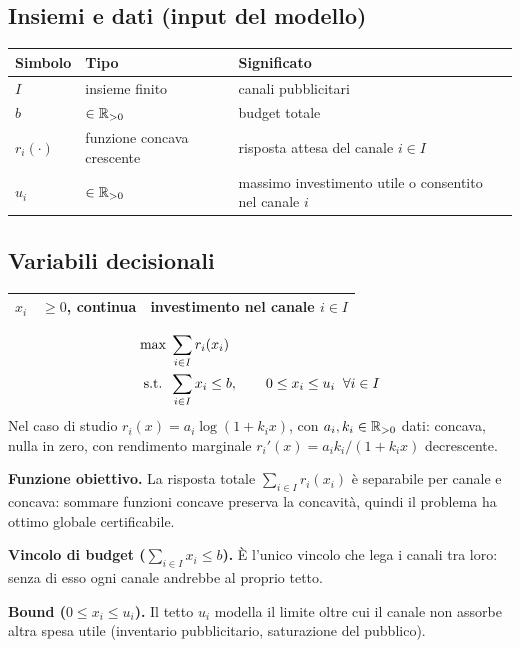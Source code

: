 \subsection*{Insiemi e dati (input del modello)}
\begin{center}\small
\begin{tabular}{llp{7.2cm}}
\toprule
Simbolo & Tipo & Significato \\
\midrule
$I$ & insieme finito & canali pubblicitari \\
$b$ & $\in \mathbb{R}_{> 0}$ & budget totale \\
$r_i(\cdot)$ & funzione concava crescente & risposta attesa del canale $i \in I$ \\
$u_i$ & $\in \mathbb{R}_{> 0}$ & massimo investimento utile o consentito nel canale $i$ \\
\bottomrule
\end{tabular}
\end{center}

\subsection*{Variabili decisionali}
\begin{center}\small
\begin{tabular}{llp{7.2cm}}
\toprule
$x_i$ & $\ge 0$, continua & investimento nel canale $i \in I$ \\
\bottomrule
\end{tabular}
\end{center}

\begin{modello}
\begin{align}
\max\;& \sum_{i \in I} r_i(x_i) \notag\\
\text{s.t.}\;\; & \sum_{i \in I} x_i \le b, \qquad 0 \le x_i \le u_i \;\;\forall i \in I \notag
\end{align}
Nel caso di studio $r_i(x) = a_i \log(1 + k_i x)$, con $a_i, k_i \in \mathbb{R}_{>0}$ dati:
concava, nulla in zero, con rendimento marginale
$r_i'(x) = a_i k_i / (1 + k_i x)$ decrescente.
\end{modello}

\begin{spiegazione}
\textbf{Funzione obiettivo.} La risposta totale $\sum_{i \in I} r_i(x_i)$ è separabile
per canale e concava: sommare funzioni concave preserva la concavità, quindi il
problema ha ottimo globale certificabile.

\textbf{Vincolo di budget ($\sum_{i \in I} x_i \le b$).} È l'unico vincolo che lega i
canali tra loro: senza di esso ogni canale andrebbe al proprio tetto.

\textbf{Bound ($0 \le x_i \le u_i$).} Il tetto $u_i$ modella il limite oltre cui il
canale non assorbe altra spesa utile (inventario pubblicitario, saturazione del
pubblico).
\end{spiegazione}

